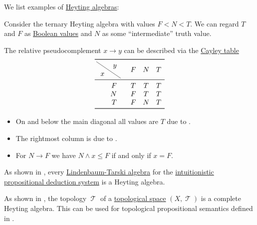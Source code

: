 \begin{example}\label{ex:def:heyting_algebra}
  We list examples of \hyperref[def:heyting_algebra]{Heyting algebras}:
  \begin{thmenum}
     Consider the ternary Heyting algebra with values \( F < N < T \). We can regard \( T \) and \( F \) as \hyperref[con:boolean_value]{Boolean values} and \( N \) as some \enquote{intermediate} truth value.

    The relative pseudocomplement \( x \rightarrow y \) can be described via the \hyperref[def:cayley_table]{Cayley table}
    \begin{equation*}
      \begin{array}{r !{\quad} *{3}{c}}
        \toprule
        \mdiagbox{x}{y} & F & N & T \\
        \midrule
        F               & T & T & T \\
        N               & F & T & T \\
        T               & F & N & T \\
        \bottomrule
      \end{array}
    \end{equation*}

    \begin{itemize}
      \item On and below the main diagonal all values are \( T \) due to .
      \item The rightmost column is due to .
      \item For \( N \rightarrow F \) we have \( N \wedge x \leq F \) if and only if \( x = F \).
    \end{itemize}

     As shown in , every \hyperref[def:lindenbaum_tarski_algebra]{Lindenbaum-Tarski algebra} for the \hyperref[def:propositional_natural_deduction_systems]{intuitionistic propositional deduction system} is a Heyting algebra.

     As shown in , the topology \( \mscrT \) of a \hyperref[def:topological_space]{topological space} \( (X, \mscrT) \) is a complete Heyting algebra. This can be used for topological propositional semantics defined in .


\end{thmenum}
\end{example}
